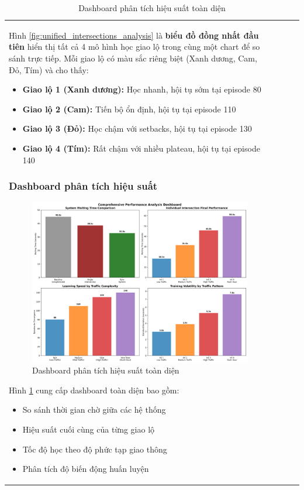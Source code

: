 \begin{table}[!htp]
\begin{tabular}{@{}lccc@{}}
Hình \ref{fig:unified_intersections_analysis} là \textbf{biểu đồ đồng nhất đầu tiên}
hiển thị tất cả 4 mô hình học giao lộ trong cùng một chart để so sánh trực tiếp.
Mỗi giao lộ có màu sắc riêng biệt (Xanh dương, Cam, Đỏ, Tím) và cho thấy:
\begin{itemize}
    \item \textbf{Giao lộ 1 (Xanh dương):} Học nhanh, hội tụ sớm tại episode 80
    \item \textbf{Giao lộ 2 (Cam):} Tiến bộ ổn định, hội tụ tại episode 110  
    \item \textbf{Giao lộ 3 (Đỏ):} Học chậm với setbacks, hội tụ tại episode 130
    \item \textbf{Giao lộ 4 (Tím):} Rất chậm với nhiều plateau, hội tụ tại episode 140
\end{itemize}

\subsubsection{Dashboard phân tích hiệu suất}

\begin{figure}[!htp]
    \centering
    \includegraphics[width=\textwidth]{figures/03_performance_dashboard.png}
    \caption{Dashboard phân tích hiệu suất toàn diện}
    \label{fig:performance_dashboard}
\end{figure}

Hình \ref{fig:performance_dashboard} cung cấp dashboard toàn diện bao gồm:
\begin{itemize}
    \item So sánh thời gian chờ giữa các hệ thống
    \item Hiệu suất cuối cùng của từng giao lộ
    \item Tốc độ học theo độ phức tạp giao thông
    \item Phân tích độ biến động huấn luyện
\end{itemize}


\end{tabular}
\end{table}
